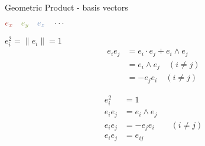 \begin{frame}[t]{Geometric Product - basis vectors}

    \begin{center}

        \Large
        $\textcolor{red}{e_x} \quad \textcolor{green}{e_y} \quad \textcolor{blue}{e_z} \quad \cdots$
        {
            \vspace{1em}

            $e_i^2 = \| e_i \| = 1$
            \begin{align*}
                e_i e_j & = e_i \cdot e_j + e_i \wedge e_j  \\
                        & = e_i \wedge e_j \quad (i \neq j) \\
                        & = - e_j e_i \quad (i \neq j)
            \end{align*}
        }

        {
            \begin{align*}
                e_i^2   & = 1                           \\
                e_i e_j & = e_i \wedge e_j              \\
                e_i e_j & = - e_j e_i \qquad (i \neq j) \\
                e_i e_j & = e_{ij}
            \end{align*}
        }


    \end{center}
\end{frame}



